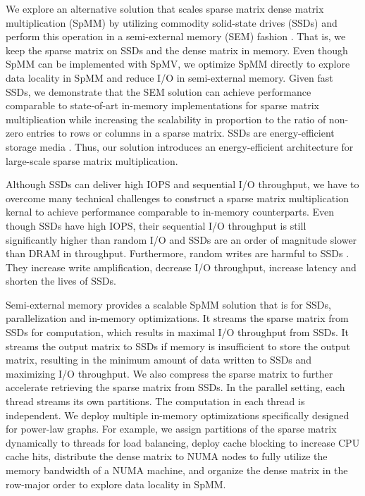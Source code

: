 We explore an alternative solution that scales sparse matrix dense matrix
multiplication (SpMM) by utilizing commodity solid-state drives (SSDs) and
perform this operation in a semi-external memory (SEM) fashion
\cite{flashgraph, Abello98}. That is, we keep the sparse matrix on SSDs and
the dense matrix in memory. Even though SpMM can be implemented with SpMV,
we optimize SpMM directly to explore data locality in SpMM and reduce I/O
in semi-external memory. Given fast SSDs, we demonstrate that the SEM solution
can achieve performance comparable to state-of-art in-memory implementations
for sparse matrix multiplication while increasing the scalability in proportion
to the ratio of non-zero entries to rows or columns in a sparse matrix.
SSDs are energy-efficient storage media \cite{}. Thus, our solution introduces
an energy-efficient architecture for large-scale sparse matrix multiplication.


Although SSDs can deliver high IOPS and sequential I/O throughput, we have
to overcome many technical challenges to construct a sparse matrix
multiplication kernal to achieve performance comparable to in-memory
counterparts. Even though SSDs have high IOPS, their sequential I/O throughput
is still significantly higher than random I/O and SSDs are an order of
magnitude slower than DRAM in throughput. Furthermore, random writes are harmful
to SSDs \cite{sfs}. They increase write amplification, decrease I/O throughput,
increase latency and shorten the lives of SSDs.

Semi-external memory provides a scalable SpMM
solution that is  for SSDs, parallelization and in-memory optimizations.
It streams the sparse matrix from SSDs for computation, which results in maximal
I/O throughput from SSDs. It streams the output matrix to SSDs if
memory is insufficient to store the output matrix, resulting in
the minimum amount of data written to SSDs and maximizing I/O throughput.
We also compress
the sparse matrix to further accelerate retrieving the sparse matrix from SSDs.
In the parallel setting, each thread streams its own partitions.
The computation in each thread is independent.
We deploy multiple in-memory optimizations specifically designed for power-law
graphs. For example, we assign partitions of the sparse matrix dynamically to
threads for load balancing, deploy cache blocking to increase CPU cache hits,
distribute the dense matrix to NUMA nodes to fully utilize the memory
bandwidth of a NUMA machine, and organize the dense matrix in the row-major order
to explore data locality in SpMM.

